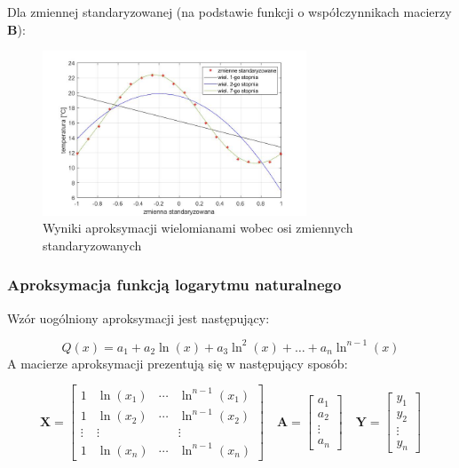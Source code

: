 \documentclass[a4paper, 12pt]{mwart}
\begin{document}
					Dla zmiennej standaryzowanej (na podstawie funkcji o współczynnikach macierzy $\textbf{B}$):
					\begin{figure}[h]
						\begin{center}
							\includegraphics[width = 0.7\textwidth]{graphs/3-s.jpg}
							\caption{Wyniki aproksymacji wielomianami wobec osi zmiennych standaryzowanych}
							\label{fig:3S}
						\end{center}
					\end{figure}

			\subsubsection{Aproksymacja funkcją logarytmu naturalnego}
				Wzór uogólniony aproksymacji jest następujący:

				$$ Q(x) = a_1 + a_2 \ln\left(x\right) + a_3\ln^2\left(x\right) + \dots + a_n \ln^{n-1} \left(x\right)$$
			\newpage
				A macierze aproksymacji prezentują się w następujący sposób:
	
				$$ \textbf{X} = \begin{bmatrix}
					1      & \ln \left(x_1\right) & \cdots & \ln^{n-1} \left(x_1\right)\\
					1      & \ln \left(x_2\right) & \cdots & \ln^{n-1} \left(x_2\right)\\
					\vdots & \vdots               &        & \vdots \\
					1      & \ln \left(x_n\right) & \cdots & \ln^{n-1} \left(x_n\right)
				\end{bmatrix}
				\quad 
				\textbf{A} = \begin{bmatrix}
					a_1\\
					a_2\\
					\vdots\\
					a_n
				\end{bmatrix} \quad
				\textbf{Y} = \begin{bmatrix}
					y_1\\
					y_2\\
					\vdots\\
					y_n
				\end{bmatrix}$$	
\end{document}
